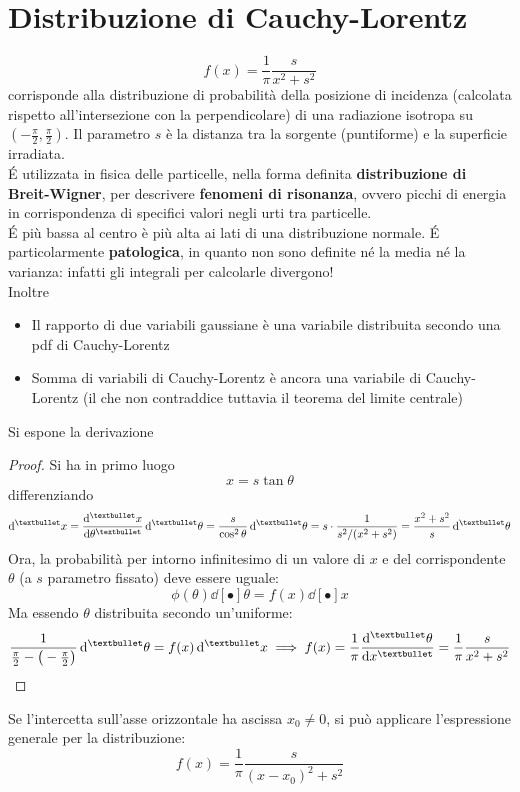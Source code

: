 \documentclass[10pt, oneside]{book}
\begin{document}
\section{Distribuzione di Cauchy-Lorentz}
\[f(x) = \frac{1}{\pi} \frac{s}{x^2 + s^2}\]
corrisponde alla distribuzione di probabilità della posizione di incidenza (calcolata rispetto all'intersezione con la perpendicolare) di una radiazione isotropa su $\displaystyle ( - \frac{\pi}{2}, \frac{\pi}{2})$. Il parametro $s$ è la distanza tra la sorgente (puntiforme) e la superficie irradiata.\\
\'E utilizzata in fisica delle particelle, nella forma definita \textbf{distribuzione di Breit-Wigner}, per descrivere \textbf{fenomeni di risonanza}, ovvero picchi di energia in corrispondenza di specifici valori negli urti tra particelle.\\
\'E più bassa al centro è più alta ai lati di una distribuzione normale. \'E particolarmente \textbf{patologica}, in quanto non sono definite né la media né la varianza: infatti gli integrali per calcolarle divergono!\\
Inoltre
\begin{itemize}
\item Il rapporto di due variabili gaussiane è una variabile distribuita secondo una pdf di Cauchy-Lorentz
\item Somma di variabili di Cauchy-Lorentz è ancora una variabile di Cauchy-Lorentz (il che non contraddice tuttavia il teorema del limite centrale)
\end{itemize}
Si espone la derivazione
\begin{proof}
Si ha in primo luogo
\[x = s \tan \theta\]
differenziando
\[\dd[•]{x} = \dv[•]{x}{\theta} \dd[•]{\theta} = \frac{s}{\cos^2 \theta} \dd[•]{\theta} = s \cdot \frac{1}{s^2/(x^2 + s^2)} = \frac{x^2 + s^2}{s} \dd[•]{\theta}\]
Ora, la probabilità per intorno infinitesimo di un valore di $x$ e del corrispondente $\theta$ (a $s$ parametro fissato) deve essere uguale:
\[\phi(\theta)\dd[•]{\theta} = f(x) \dd[•]{x}\]
Ma essendo $\theta$ distribuita secondo un'uniforme:
\[\frac{1}{\frac{\pi}{2} - \big(- \frac{\pi}{2}\big)} \dd[•]{\theta} = f(x) \dd[•]{x} \implies f(x) = \frac{1}{\pi} \dv[•]{\theta}{x} = \frac{1}{\pi} \frac{s}{x^2 + s^2}\]
\end{proof}
Se l'intercetta sull'asse orizzontale ha ascissa $x_0 \neq 0$, si può applicare l'espressione generale per la distribuzione:
\[f(x) = \frac{1}{\pi} \frac{s}{(x-x_0)^2 + s^2}\]
\end{document}
